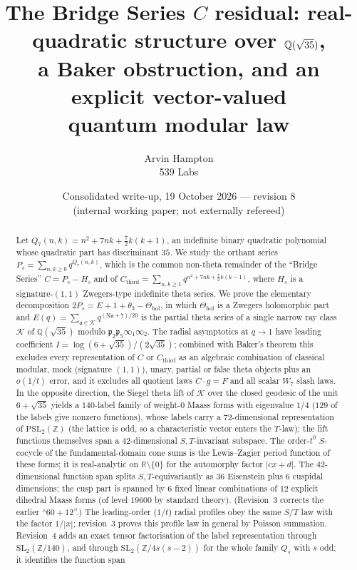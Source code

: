 \documentclass[11pt]{article}
\title{The Bridge Series $C$ residual: real-quadratic structure over $\Q(\sqrt{35})$,\\
a Baker obstruction, and an explicit vector-valued\\ quantum modular law}
\author{Arvin Hampton\\ \small 539 Labs}
\date{Consolidated write-up, 19 October 2026 --- revision 8\\ \small (internal working paper; not externally refereed)}
\theoremstyle{definition}
\theoremstyle{plain}
\newcommand{\Q}{\mathbb{Q}}
\newcommand{\Z}{\mathbb{Z}}
\newcommand{\R}{\mathbb{R}}
\newcommand{\K}{\mathcal{K}}
\newcommand{\fp}{\mathfrak{p}}
\newcommand{\fa}{\mathfrak{a}}
\newcommand{\Thol}{\Theta_{\mathrm{hol}}}
\newcommand{\Cthird}{C_{\mathrm{third}}}
\newcommand{\Nm}{\mathrm{N}}
\begin{document}
\maketitle

\begin{abstract}
Let $Q_7(n,k)=n^2+7nk+\tfrac72 k(k+1)$, an indefinite binary quadratic polynomial whose
quadratic part has discriminant $35$. We study the orthant series
$P_s=\sum_{n,k\ge 0}q^{Q_7(n,k)}$, which is the common non-theta remainder of the
``Bridge Series'' $C=P_s-H_s$ and of $\Cthird=\sum_{n,k\ge1}q^{n^2+7nk+\frac72k(k-1)}$,
where $H_s$ is a signature-$(1,1)$ Zwegers-type indefinite theta series.
We prove the elementary decomposition $2P_s=E+1+\theta_3-\Thol$, in which
$\Thol$ is a Zwegers holomorphic part and $E(q)=\sum_{\fa\in\K}q^{(\Nm\fa+7)/20}$ is the
partial theta series of a single narrow ray class $\K$ of $\Q(\sqrt{35})$ modulo $\fp_2\fp_5\infty_1\infty_2$.
The radial asymptotics at $q\to1$ have leading coefficient
$I=\log(6+\sqrt{35})/(2\sqrt{35})$; combined with Baker's theorem this excludes every
representation of $C$ or $\Cthird$ as an algebraic combination of classical modular, mock
(signature $(1,1)$), unary, partial or false theta objects plus an $o(1/t)$ error, and it excludes
all quotient laws $C\cdot g=F$ and all scalar $W_7$ slash laws. In the opposite direction,
the Siegel theta lift of $\K$ over the closed geodesic of the unit $6+\sqrt{35}$ yields a
$140$-label family of weight-$0$ Maass forms with eigenvalue $1/4$ ($129$ of the labels give nonzero functions), whose labels carry a $72$-dimensional
representation of $\mathrm{PSL}_2(\Z)$ (the lattice is odd, so a characteristic vector enters the $T$-law); the lift functions themselves span a
$42$-dimensional $S,T$-invariant subspace.
The order-$t^0$ $S$-cocycle of the fundamental-domain cone sums is the Lewis--Zagier period
function of these forms; it is real-analytic on $\R\setminus\{0\}$ for the automorphy factor
$|cx+d|$. The $42$-dimensional function span splits $S,T$-equivariantly as $36$ Eisenstein plus $6$ cuspidal dimensions; the cusp part is
spanned by $6$ fixed linear combinations of $12$ explicit dihedral Maass forms (of level $19600$ by standard theory). (Revision~3 corrects the
earlier ``$60+12$''.) The leading-order ($1/t$) radial profiles obey the same $S/T$ law with the factor $1/|x|$; revision~3 proves this
profile law in general by Poisson summation. Revision~4 adds an exact tensor factorisation of the label representation through
$\mathrm{SL}_2(\Z/140)$, and through $\mathrm{SL}_2(\Z/4s(s-2))$ for the whole family $Q_s$ with $s$ odd; it identifies the function span

\end{abstract}
\end{document}

